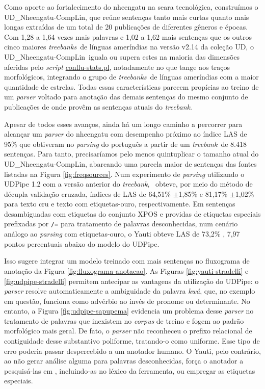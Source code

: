 \documentclass[portuguese]{textolivre}
\newcommand{\udc}{coleção UD}
\newcommand{\tbc}{UD\_Nheengatu-CompLin}
\newcommand{\tbs}{\textit{treebanks}}
\newcommand{\tb}{\textit{treebank}}
\newcommand{\vquatro}{\textcite{de-alencar-2024-universal-k}}
\newcommand{\pvtres}{\parencite{alencar2023-yauti}}
\begin{document}
Como aporte ao fortalecimento do nheengatu na seara tecnológica, construímos o \tbc, que reúne sentenças tanto mais curtas quanto mais longas extraídas de um total de 20 publicações de diferentes gêneros e épocas. Com 1,28 a 1,64 vezes mais palavras e 1,02 a 1,62 mais sentenças que os outros cinco maiores \tbs~de línguas ameríndias na versão v2.14 da \udc, o \tbc~iguala ou supera estes na maioria das dimensões aferidas pelo \textit{script} \href{https://github.com/UniversalDependencies/tools/blob/master/conllu-stats.pl}{conllu-stats.pl}, notadamente no que tange aos traços morfológicos, integrando o grupo de \tbs~de línguas ameríndias com a maior quantidade de estrelas. Todas essas características parecem propícias ao treino de um \textit{parser} voltado para anotação das demais sentenças do mesmo conjunto de publicações de onde provêm as sentenças atuais do \tb.    

Apesar de todos esses avanços, ainda há um longo caminho a percorrer para alcançar um \textit{parser} do nheengatu com desempenho próximo ao índice LAS de 95\% que \textcite{lopes-pardo-2024-towards-k} obtiveram no \textit{parsing} do português a partir de um \tb~de 8.418 sentenças. Para tanto, precisaríamos pelo menos quintuplicar o tamanho atual do \tbc, abarcando uma parcela maior de sentenças das fontes listadas na Figura \ref{fig:freqsources}. Num experimento de \textit{parsing} utilizando o UDPipe 1.2 com a versão anterior do \tb, \vquatro~obteve, por meio do método de décupla validação cruzada, índices de LAS de 64,51\% $\pm$1,85\% e 81,17\% $\pm$1,02\% para texto cru e texto com etiquetas-ouro, respectivamente. Em sentenças desambiguadas com etiquetas do conjunto XPOS e providas de etiquetas especiais prefixadas por \texttt{/=} para tratamento de palavras desconhecidas, num cenário análogo ao \textit{parsing} com etiquetas-ouro, o Yauti obteve LAS de 73,2\% \pvtres, 7,97 pontos percentuais abaixo do modelo do UDPipe. 

Isso sugere integrar um modelo treinado com mais sentenças no fluxograma de anotação da Figura \ref{fig:fluxograma-anotacao}. As Figuras \ref{fig:yauti-stradelli} e \ref{fig:udpipe-stradelli} permitem antecipar as vantagens da utilização do UDPipe: o \textit{parser} resolve automaticamente a ambiguidade da palavra \textit{kwá}, que, no exemplo em questão, funciona como advérbio ao invés de pronome ou determinante. No entanto, a Figura \ref{fig:udpipe-sapupema} evidencia um problema desse \textit{parser} no tratamento de palavras que inexistem no \textit{corpus} de treino e fogem ao padrão morfológico mais geral. De fato, o \textit{parser} não reconheceu o prefixo relacional de contiguidade desse substantivo poliforme, tratando-o como uniforme. Esse tipo de erro poderia passar despercebido a um anotador humano. O Yauti, pelo contrário, ao não gerar análise alguma para palavras desconhecidas, força o anotador a pesquisá-las em \textcite{avila2021}, incluindo-as no léxico da ferramenta, ou empregar as etiquetas especiais. 
\end{document}
